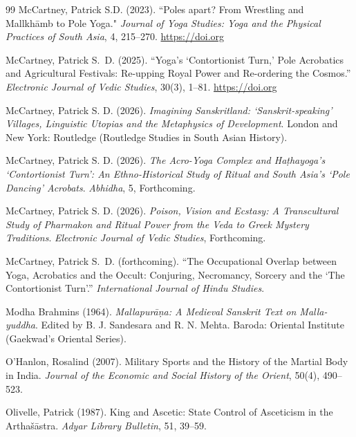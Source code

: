 \documentclass[11pt,twoside,letterpaper]{article}
\begin{document}
\begin{thebibliography}{99}
McCartney, Patrick S.D. (2023). ``Poles apart? From Wrestling and Mallkhāmb to Pole Yoga." \textit{Journal of Yoga Studies: Yoga and the Physical Practices of South Asia}, 4, 215–270. \url{https://doi.org}

McCartney, Patrick S.~D. (2025). ``Yoga's `Contortionist Turn,' Pole Acrobatics and Agricultural Festivals: Re-upping Royal Power and Re-ordering the Cosmos.'' \textit{Electronic Journal of Vedic Studies}, 30(3), 1--81. \url{https://doi.org}

McCartney, Patrick S. D. (2026). \textit{Imagining Sanskritland: `Sanskrit-speaking' Villages, Linguistic Utopias and the Metaphysics of Development}. London and New York: Routledge (Routledge Studies in South Asian History).

McCartney, Patrick S. D. (2026). \textit{The Acro-Yoga Complex and Ha\d{t}hayoga's `Contortionist Turn': An Ethno-Historical Study of Ritual and South Asia's `Pole Dancing' Acrobats}. \textit{Abhidha}, 5, Forthcoming.

McCartney, Patrick S. D. (2026). \textit{Poison, Vision and Ecstasy: A Transcultural Study of Pharmakon and Ritual Power from the Veda to Greek Mystery Traditions}. \textit{Electronic Journal of Vedic Studies}, Forthcoming.

McCartney, Patrick S.~D. (forthcoming). ``The Occupational Overlap between Yoga, Acrobatics and the Occult: Conjuring, Necromancy, Sorcery and the `The Contortionist Turn'.'' \textit{International Journal of Hindu Studies}.

Modha Brahmins (1964). \textit{Mallapurāṇa: A Medieval Sanskrit Text on Malla-yuddha}. Edited by B. J. Sandesara and R. N. Mehta. Baroda: Oriental Institute (Gaekwad's Oriental Series).

O'Hanlon, Rosalind (2007). Military Sports and the History of the Martial Body in India. \textit{Journal of the Economic and Social History of the Orient}, 50(4), 490--523.

Olivelle, Patrick (1987). King and Ascetic: State Control of Asceticism in the Artha\v{s}\={a}stra. \textit{Adyar Library Bulletin}, 51, 39--59.


\end{thebibliography}
\end{document}
